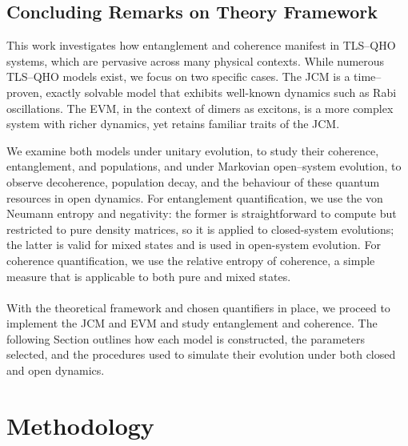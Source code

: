\documentclass[11pt]{article}
\begin{document}
\subsection{Concluding Remarks on Theory Framework}

This work investigates how entanglement and coherence manifest in TLS--QHO systems, which are pervasive across many physical contexts. While numerous TLS--QHO models exist, we focus on two specific cases. The JCM is a time--proven, exactly solvable model that exhibits well-known dynamics such as Rabi oscillations. The EVM, in the context of dimers as excitons, is a more complex system with richer dynamics, yet retains familiar traits of the JCM.

We examine both models under unitary evolution, to study their coherence, entanglement, and populations, and under Markovian open--system evolution, to observe decoherence, population decay, and the behaviour of these quantum resources in open dynamics. For entanglement quantification, we use the von Neumann entropy and negativity: the former is straightforward to compute but restricted to pure density matrices, so it is applied to closed-system evolutions; the latter is valid for mixed states and is used in open-system evolution. For coherence quantification, we use the relative entropy of coherence, a simple measure that is applicable to both pure and mixed states.\\
\\
With the theoretical framework and chosen quantifiers in place, we proceed to implement the JCM and EVM and study entanglement and coherence. The following Section outlines how each model is constructed, the parameters selected, and the procedures used to simulate their evolution under both closed and open dynamics. 
\newpage
\section{Methodology} \label{sec:method}
\end{document}
